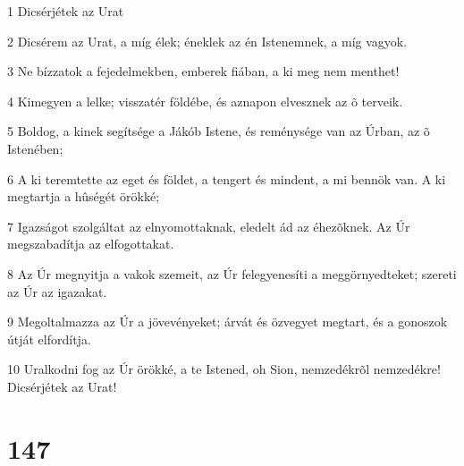 \par 1 Dicsérjétek az Urat
\par 2 Dicsérem az Urat, a míg élek; éneklek az én Istenemnek, a míg vagyok.
\par 3 Ne bízzatok a fejedelmekben, emberek fiában, a ki meg nem menthet!
\par 4 Kimegyen a lelke; visszatér földébe, és aznapon elvesznek az õ terveik.
\par 5 Boldog, a kinek segítsége a Jákób Istene, és reménysége van az Úrban, az õ Istenében;
\par 6 A ki teremtette az eget és földet, a tengert és mindent, a mi bennök van. A ki megtartja a hûségét örökké;
\par 7 Igazságot szolgáltat az elnyomottaknak, eledelt ád az éhezõknek. Az Úr megszabadítja az elfogottakat.
\par 8 Az Úr megnyitja a vakok szemeit, az Úr felegyenesíti a meggörnyedteket; szereti az Úr az igazakat.
\par 9 Megoltalmazza az Úr a jövevényeket; árvát és özvegyet megtart, és a gonoszok útját elfordítja.
\par 10 Uralkodni fog az Úr örökké, a te Istened, oh Sion, nemzedékrõl nemzedékre! Dicsérjétek az Urat!

\chapter{147}


